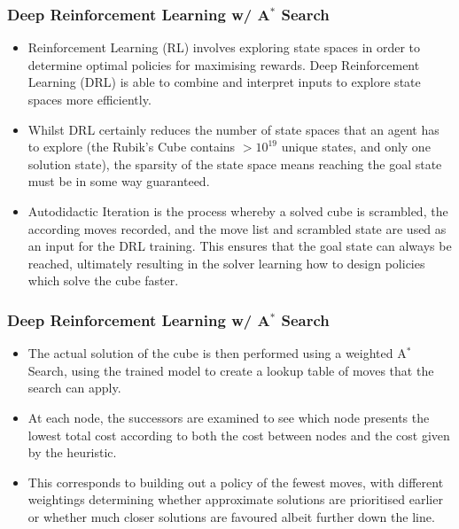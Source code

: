 \documentclass{beamer}
\begin{document}
\begin{frame}
\frametitle{Deep Reinforcement Learning w/ A$^\ast$ Search}
\begin{itemize}
    \item Reinforcement Learning (RL) involves exploring state spaces in order to determine optimal policies for maximising rewards. Deep Reinforcement Learning (DRL) is able to combine and interpret inputs to explore state spaces more efficiently.
    \item Whilst DRL certainly reduces the number of state spaces that an agent has to explore (the Rubik's Cube contains $ > 10^{19}$ unique states, and only one solution state), the sparsity of the state space means reaching the goal state must be in some way guaranteed.
    \item Autodidactic Iteration is the process whereby a solved cube is scrambled, the according moves recorded, and the move list and scrambled state are used as an input for the DRL training. This ensures that the goal state can always be reached, ultimately resulting in the solver learning how to design policies which solve the cube faster.
\end{itemize}
\end{frame}

\begin{frame}
\frametitle{Deep Reinforcement Learning w/ A$^\ast$ Search}
\begin{itemize}
    \item The actual solution of the cube is then performed using a weighted A$^\ast$ Search, using the trained model to create a lookup table of moves that the search can apply.
    \item At each node, the successors are examined to see which node presents the lowest total cost according to both the cost between nodes and the cost given by the heuristic. 
    \item This corresponds to building out a policy of the fewest moves, with different weightings determining whether approximate solutions are prioritised earlier or whether much closer solutions are favoured albeit further down the line. 
\end{itemize}
\end{frame}
\end{document}
